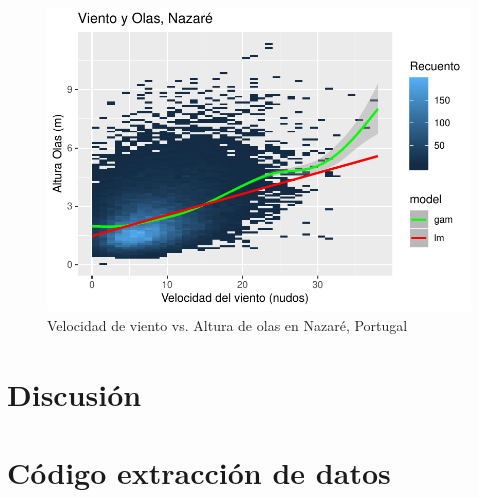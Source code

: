 \begin{figure}[H]
    \centering
    \includegraphics{./figures/nazare_all.pdf}
    \caption{Velocidad de viento vs. Altura de olas en Nazaré, Portugal}
    \label{fig:wind_waves_nazare_all}
\end{figure}

%
%
%

\section{Discusión}%
\label{sec:discusión}

\pagebreak
\appendix

\section{Código extracción de datos}%
\label{sec:codigo_extraccion_de_datos}




